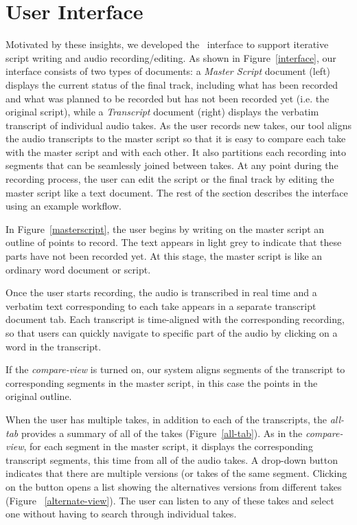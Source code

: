 \section{User Interface}
Motivated by these insights, we developed the \systemname\  interface to support iterative script writing and  audio recording/editing. As shown in Figure~\ref{interface}, our interface consists of two types of documents: a \textit{Master Script} document (left) displays the current status of the final track, including what has been recorded and what was planned to be recorded but has not been recorded yet (i.e. the original script), while a \textit{Transcript} document (right) displays the verbatim transcript of individual audio takes. As the user records new takes, our tool aligns the audio transcripts to the master script so that it is easy to compare each take with the master script and with each other. It also partitions each recording into segments that can be seamlessly joined between takes. At any point during the recording process, the user can edit the script or the final track by editing the master script like a text document. The rest of the section describes the interface using an example workflow. 

In Figure~\ref{masterscript}, the user begins by writing on the master script an outline  of points to record. The text appears in light grey to indicate that these parts have not been recorded yet. At this stage, the master script is like an ordinary
word document or script. 

Once the user starts recording, the audio is transcribed in real time and a verbatim text corresponding to each take appears in a separate transcript document tab. Each transcript is time-aligned with the corresponding recording, so that users can quickly navigate to specific
part of the audio by clicking on a word in the transcript.

If the \textit{compare-view} is turned on, our system aligns segments of the transcript to corresponding segments in the master script, in this case the points in the original outline.


When the user has multiple takes, in addition to each of the transcripts, the \textit{all-tab} provides a summary of all of the takes (Figure~\ref{all-tab}). As in the \textit{compare-view}, for each segment in the master script, it displays the corresponding transcript segments, this time from all of the audio takes. A drop-down button indicates that there are multiple versions (or takes of the same segment. Clicking on the button opens a
list showing the alternatives versions from different takes (Figure ~\ref{alternate-view}). The user can listen to any of these takes and select one without having to search through individual takes. 

